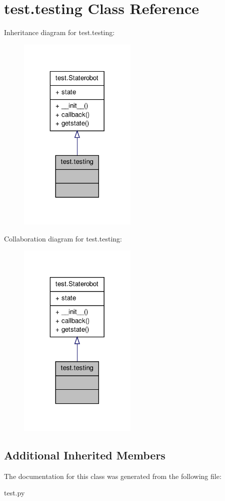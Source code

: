 \hypertarget{classtest_1_1testing}{\section{test.\-testing Class Reference}
\label{classtest_1_1testing}
}


Inheritance diagram for test.\-testing\-:
\nopagebreak
\begin{figure}[H]
\begin{center}
\leavevmode
\includegraphics[width=160pt]{classtest_1_1testing__inherit__graph}
\end{center}
\end{figure}


Collaboration diagram for test.\-testing\-:
\nopagebreak
\begin{figure}[H]
\begin{center}
\leavevmode
\includegraphics[width=160pt]{classtest_1_1testing__coll__graph}
\end{center}
\end{figure}
\subsection*{Additional Inherited Members}


The documentation for this class was generated from the following file\-:\begin{DoxyCompactItemize}
\item 
test.\-py\end{DoxyCompactItemize}
